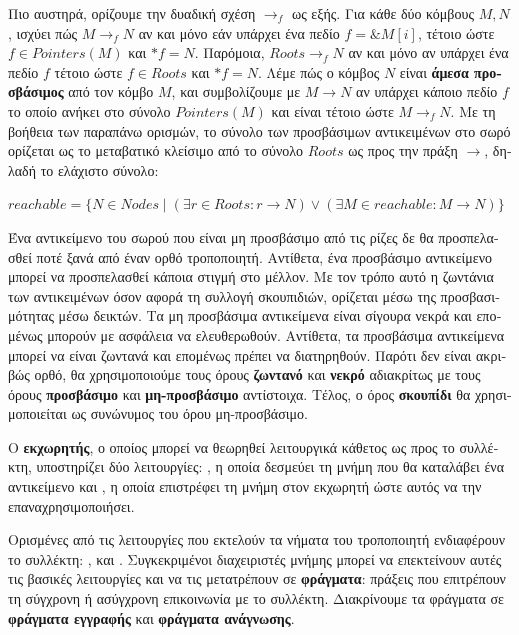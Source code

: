 \begin{greek}
Πιο αυστηρά, ορίζουμε την δυαδική σχέση $\rightarrow_f$ ως εξής.
Για κάθε δύο κόμβους $M, N$, ισχύει πώς $M\rightarrow_f N$ αν
και μόνο εάν υπάρχει ένα πεδίο $f = \& M[i]$, τέτοιο ώστε
$f \in Pointers(M)$ και $*f = N$. Παρόμοια, $Roots \rightarrow_f N$
αν και μόνο αν υπάρχει ένα πεδίο $f$ τέτοιο ώστε $f \in Roots$
και $*f = N$. Λέμε πώς ο κόμβος $N$ είναι \textbf{άμεσα προσβάσιμος}
από τον κόμβο $M$, και συμβολίζουμε με $M \rightarrow N$ αν υπάρχει
κάποιο πεδίο $f$ το οποίο ανήκει στο σύνολο $Pointers(M)$ και είναι
τέτοιο ώστε $M \rightarrow_f N$. Με τη βοήθεια των παραπάνω ορισμών,
το σύνολο των προσβάσιμων αντικειμένων στο σωρό ορίζεται ως το
μεταβατικό κλείσιμο από το σύνολο $Roots$ ως προς την πράξη
$\rightarrow$, δηλαδή το ελάχιστο σύνολο:

$reachable = \{ N \in Nodes \mid (\exists r \in Roots: r \rightarrow N) \lor (\exists M \in reachable: M \rightarrow N) \}$

Ένα αντικείμενο του σωρού που είναι μη προσβάσιμο από τις ρίζες
δε θα προσπελασθεί ποτέ ξανά από έναν ορθό τροποποιητή. Αντίθετα,
ένα προσβάσιμο αντικείμενο μπορεί να προσπελασθεί κάποια στιγμή
στο μέλλον. Με τον τρόπο αυτό η ζωντάνια των αντικειμένων όσον
αφορά τη συλλογή σκουπιδιών, ορίζεται μέσω της προσβασιμότητας
μέσω δεικτών. Τα μη προσβάσιμα αντικείμενα είναι σίγουρα νεκρά
και επομένως μπορούν με ασφάλεια να ελευθερωθούν. Αντίθετα,
τα προσβάσιμα αντικείμενα μπορεί να είναι ζωντανά και επομένως
πρέπει να διατηρηθούν. Παρότι δεν είναι ακριβώς ορθό, θα χρησιμοποιούμε
τους όρους \textbf{ζωντανό} και \textbf{νεκρό} αδιακρίτως με
τους όρους \textbf{προσβάσιμο} και \textbf{μη-προσβάσιμο} αντίστοιχα. 
Τέλος, ο όρος \textbf{σκουπίδι} θα χρησιμοποιείται ως συνώνυμος
του όρου μη-προσβάσιμο.

Ο \textbf{εκχωρητής}, ο οποίος μπορεί να θεωρηθεί λειτουργικά
κάθετος ως προς το συλλέκτη, υποστηρίζει δύο λειτουργίες:
\textenglish{}, η οποία δεσμεύει τη μνήμη που θα καταλάβει
ένα αντικείμενο και \textenglish{}, η  οποία επιστρέφει
τη μνήμη στον εκχωρητή ώστε αυτός να την επαναχρησιμοποιήσει.

Ορισμένες από τις λειτουργίες που εκτελούν τα νήματα του τροποποιητή
ενδιαφέρουν το συλλέκτη: \textenglish{}, \textenglish{} και
\textenglish{}. Συγκεκριμένοι διαχειριστές μνήμης μπορεί να
επεκτείνουν αυτές τις βασικές λειτουργίες και να τις μετατρέπουν
σε \textbf{φράγματα}: πράξεις που επιτρέπουν τη σύγχρονη
ή ασύγχρονη επικοινωνία με το συλλέκτη. Διακρίνουμε τα φράγματα
σε \textbf{φράγματα εγγραφής} και \textbf{φράγματα ανάγνωσης}.


\end{greek}
